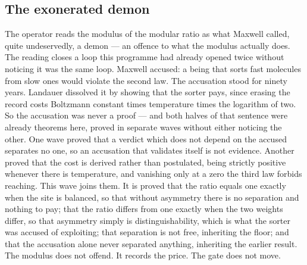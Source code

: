\documentclass[11pt]{article}
\theoremstyle{definition}\newtheorem{deriv}{Derivation}
\begin{document}
\subsection*{The exonerated demon}The operator reads the modulus of the modular ratio as what Maxwell called, quite undeservedly, a demon --- an offence to what the modulus actually does. The reading closes a loop this programme had already opened twice without noticing it was the same loop. Maxwell accused: a being that sorts fast molecules from slow ones would violate the second law. The accusation stood for ninety years. Landauer dissolved it by showing that the sorter pays, since erasing the record costs Boltzmann constant times temperature times the logarithm of two. So the accusation was never a proof --- and both halves of that sentence were already theorems here, proved in separate waves without either noticing the other. One wave proved that a verdict which does not depend on the accused separates no one, so an accusation that validates itself is not evidence. Another proved that the cost is derived rather than postulated, being strictly positive whenever there is temperature, and vanishing only at a zero the third law forbids reaching. This wave joins them. It is proved that the ratio equals one exactly when the site is balanced, so that without asymmetry there is no separation and nothing to pay; that the ratio differs from one exactly when the two weights differ, so that asymmetry simply is distinguishability, which is what the sorter was accused of exploiting; that separation is not free, inheriting the floor; and that the accusation alone never separated anything, inheriting the earlier result. The modulus does not offend. It records the price. The gate does not move.
\end{document}
